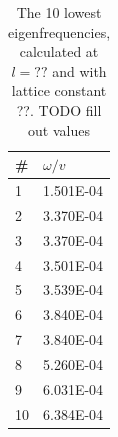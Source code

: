 \documentclass[a4paper, 12pt]{article}
\begin{document}
\begin{table}
  \centering
  \begin{tabular}{ll}
    \#& $\omega/v$\\
    \hline
    1&	1.501E-04\\
    2&	3.370E-04\\
    3&	3.370E-04\\
    4&	3.501E-04\\
    5&	3.539E-04\\
    6&	3.840E-04\\
    7&	3.840E-04\\
    8&	5.260E-04\\
    9&	6.031E-04\\
    10&	6.384E-04
  \end{tabular}
  \caption{The 10 lowest eigenfrequencies, calculated at $l=??$ and with lattice constant ??. TODO fill out values}
\end{table}
\end{document}
